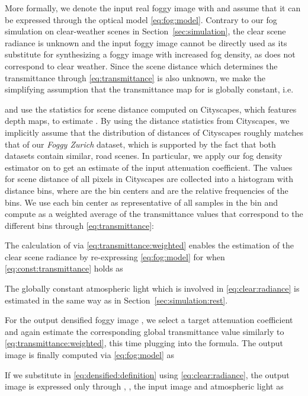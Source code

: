 \documentclass[twocolumn]{svjour3}          \smartqed  \usepackage{graphicx}
\begin{document}
More formally, we denote the input real foggy image with  and assume that it can be expressed through the optical model \eqref{eq:fog:model}. Contrary to our fog simulation on clear-weather scenes in Section~\ref{sec:simulation}, the clear scene radiance  is unknown and the input foggy image  cannot be directly used as its substitute for synthesizing a foggy image  with increased fog density, as  does not correspond to clear weather. Since the scene distance  which determines the transmittance through \eqref{eq:transmittance} is also unknown, we make the simplifying assumption that the transmittance map for  is globally constant, i.e.

and use the statistics for scene distance  computed on Cityscapes, which features depth maps, to estimate . By using the distance statistics from Cityscapes, we implicitly assume that the distribution of distances of Cityscapes roughly matches that of our \emph{Foggy Zurich} dataset, which is supported by the fact that both datasets contain similar, road scenes. In particular, we apply our fog density estimator on  to get an estimate  of the input attenuation coefficient. The values for scene distance  of all pixels in Cityscapes are collected into a histogram  with  distance bins, where  are the bin centers and  are the relative frequencies of the bins. We use each bin center as representative of all samples in the bin and compute  as a weighted average of the transmittance values that correspond to the different bins through \eqref{eq:transmittance}:


The calculation of  via \eqref{eq:transmittance:weighted} enables the estimation of the clear scene radiance  by re-expressing \eqref{eq:fog:model} for  when \eqref{eq:const:transmittance} holds as

The globally constant atmospheric light  which is involved in \eqref{eq:clear:radiance} is estimated in the same way as in Section~\ref{sec:simulation:rest}.

For the output densified foggy image , we select a target attenuation coefficient  and again estimate the corresponding global transmittance value  similarly to \eqref{eq:transmittance:weighted}, this time plugging  into the formula. The output image  is finally computed via \eqref{eq:fog:model} as

If we substitute  in \eqref{eq:densified:definition} using \eqref{eq:clear:radiance}, the output image is expressed only through , , the input image  and atmospheric light  as
\end{document}
